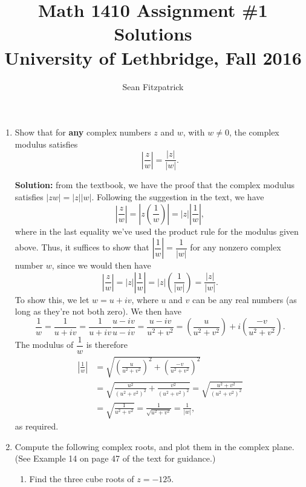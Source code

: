\documentclass[letterpaper,12pt]{amsart}
\title{Math 1410 Assignment \#1 Solutions\\University of Lethbridge, Fall 2016}
\author{Sean Fitzpatrick}
\newcommand{\abs}[1]{\left\lvert #1\right\rvert}
\begin{document}
 \maketitle

\begin{enumerate}
\item Show that for \textbf{any} complex numbers $z$ and $w$, with $w\neq 0$, the complex modulus satisfies
\[
 \left\lvert\frac{z}{w}\right\rvert = \frac{\abs{z}}{\abs{w}}.
\]

\medskip

\textbf{Solution:} from the textbook, we have the proof that the complex modulus satisfies $\abs{zw}=\abs{z}\abs{w}$. Following the suggestion in the text, we have
\[
 \abs{\frac{z}{w}} = \abs{z\left(\frac{1}{w}\right)} = \abs{z}\abs{\frac{1}{w}},
\]
where in the last equality we've used the product rule for the modulus given above. Thus, it suffices to show that $\left\lvert\dfrac{1}{w}\right\rvert = \dfrac{1}{\abs{w}}$ for any nonzero complex number $w$, since we would then have
\[
 \abs{\frac{z}{w}} = \abs{z}\abs{\frac{1}{w}} = \abs{z}\left(\frac{1}{\abs{w}}\right) = \frac{\abs{z}}{\abs{w}}.
\]
To show this, we let $w=u+iv$, where $u$ and $v$ can be any real numbers (as long as they're not both zero). We then have
\[
 \frac{1}{w} = \frac{1}{u+iv} = \frac{1}{u+iv}\frac{u-iv}{u-iv} = \frac{u-iv}{u^2+v^2} = \left(\frac{u}{u^2+v^2}\right)+i\left(\frac{-v}{u^2+v^2}\right).
\]
The modulus of $\dfrac{1}{w}$ is therefore
\begin{align*}
 \abs{\frac{1}{w}} & = \sqrt{\left(\frac{u}{u^2+v^2}\right)^2+\left(\frac{-v}{u^2+v^2}\right)^2}\\
 & = \sqrt{\frac{u^2}{(u^2+v^2)^2}+\frac{v^2}{(u^2+v^2)^2}} = \sqrt{\frac{u^2+v^2}{(u^2+v^2)^2}}\\
 & = \sqrt{\frac{1}{u^2+v^2}} = \frac{1}{\sqrt{u^2+v^2}} = \frac{1}{\abs{w}},
\end{align*}
as required.

\item Compute the following complex roots, and plot them in the complex plane. \\(See Example 14 on page 47 of the text for guidance.)

\medskip

\begin{enumerate}
 \item Find the three cube roots of $z=-125$.

\bigskip


\end{enumerate}
\end{enumerate}
\end{document}
